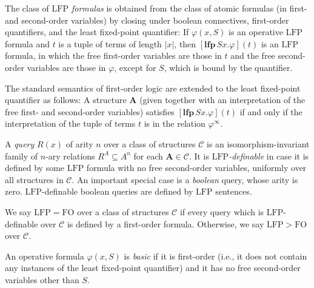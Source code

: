\documentclass{lmcs}
\newcommand{\LFP}{\mathrm{LFP}}
\newcommand{\FO}{\mathrm{FO}}
\newcommand{\A}{\mathbf{A}}
\theoremstyle{thmC}
\begin{document}
\begin{defi}\label{def:lfp}
The class of \emph{$\LFP$ formulas} is obtained from the class of atomic formulas (in first- and second-order variables) by closing under boolean connectives, first-order quantifiers, and the least fixed-point quantifier: If $\varphi(x,S)$ is an operative $\LFP$ formula and $t$ is a tuple of terms of length $|x|$, then  $[\mathbf{lfp}\,Sx.\varphi](t)$ is an $\LFP$ formula, in which the free first-order variables are those in $t$ and the free second-order variables are those in $\varphi$, except for $S$, which is bound by the quantifier.

The standard semantics of first-order logic are extended to the least fixed-point quantifier as follows: A structure $\A$ (given together with an interpretation of the free first- and second-order variables) satisfies  $[\mathbf{lfp}\,Sx.\varphi](t)$ if and only if the interpretation of the tuple of terms $t$ is in the relation $\varphi^\infty$.
\end{defi}

\begin{defi}
A \emph{query} $R(x)$ of arity $n$ over a class of structures $\mathcal{C}$ is an isomorphism-invariant family of $n$-ary relations $R^A \subseteq A^n$ for each $\A \in \mathcal{C}$. It is \emph{$\LFP$-definable} in case it is defined by some $\LFP$ formula with no free second-order variables, uniformly over all structures in $\mathcal{C}$. An important special case is a \emph{boolean} query, whose arity is zero. $\LFP$-definable boolean queries are defined by $\LFP$ sentences.

We say $\LFP = \FO$ over a class of structures $\mathcal{C}$ if every query which is $\LFP$-definable over $\mathcal{C}$ is defined by a first-order formula. Otherwise, we say $\LFP>\FO$ over $\mathcal{C}$.
\end{defi}

\begin{defi}
An operative formula $\varphi(x,S)$ is \emph{basic} if it is first-order (i.e., it does not contain any instances of the least fixed-point quantifier) and it has no free second-order variables other than $S$.
\end{defi}
\end{document}
